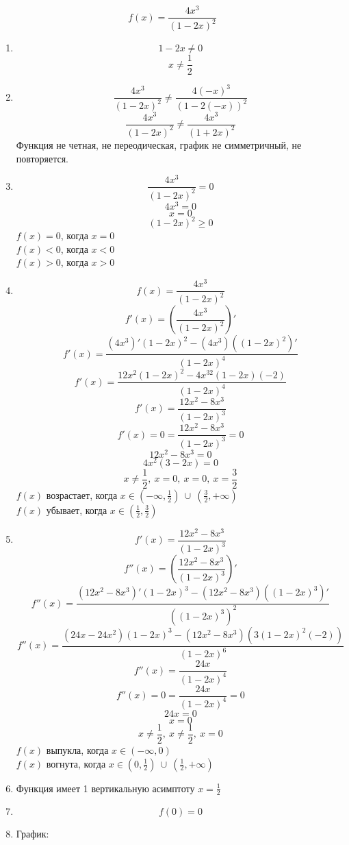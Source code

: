 \documentclass{article}
\begin{document}
$$ f(x) = \frac{4x^3}{(1-2x)^2}$$

\begin{enumerate}
  \item $$ 1-2x \neq 0$$ $$x \neq \frac{1}{2}$$
  \item $$ \frac{4x^3}{(1-2x)^2} \neq \frac{4(-x)^3}{(1-2(-x))^2}$$
        $$ \frac{4x^3}{(1-2x)^2} \neq \frac{4x^3}{(1+2x)^2}$$
        Функция не четная, не переодическая, график не симметричный, не повторяется.
  \item $$ \frac{4x^3}{(1-2x)^2} = 0$$
        $$  4x^3 = 0$$
        $$  x = 0 $$
        $$  (1-2x)^2 \geq 0 $$
        $ f(x) = 0 $, когда $x = 0$ \\
        $ f(x) < 0 $, когда $x < 0$ \\
        $ f(x) > 0 $, когда $x > 0$
  \item $$ f(x) =  \frac{4x^3}{(1-2x)^2} $$
        $$ f'(x) =  \left(\frac{4x^3}{(1-2x)^2}\right)' $$
        $$ f'(x) =  \frac{(4x^3)'(1-2x)^2 - (4x^3)((1-2x)^2)'}{(1-2x)^4} $$
        $$ f'(x) =  \frac{12x^2(1-2x)^2 - 4x^32(1-2x)(-2)}{(1-2x)^4} $$
        $$ f'(x) =  \frac{12x^2 - 8x^3}{(1-2x)^3} $$
        $$ f'(x) = 0 =  \frac{12x^2 - 8x^3}{(1-2x)^3} = 0 $$
        $$ 12x^2 - 8x^3= 0 $$
        $$ 4x^2(3 - 2x) = 0 $$
        $$ x \neq \frac{1}{2},\ x = 0,\ x=0,\ x = \frac{3}{2}$$
        $ f(x) $ возрастает, когда $x \in (-\infty, \frac{1}{2})\ \cup\ (\frac{3}{2},+\infty) $ \\
        $ f(x) $ убывает, когда $x \in (\frac{1}{2}, \frac{3}{2}) $ \\
  \item $$ f'(x) =  \frac{12x^2 - 8x^3}{(1-2x)^3} $$
        $$ f''(x) =  \left( \frac{12x^2 - 8x^3}{(1-2x)^3}\right)' $$
        $$ f''(x) =  \frac{(12x^2 - 8x^3)'(1-2x)^3 - (12x^2 - 8x^3)((1-2x)^3)'}{((1-2x)^3)^2} $$
        $$ f''(x) =  \frac{(24x - 24x^2)(1-2x)^3 - (12x^2 - 8x^3)(3(1-2x)^2(-2))}{(1-2x)^6} $$
        $$ f''(x) =  \frac{24x}{(1-2x)^4} $$
        $$ f''(x) = 0 =   \frac{24x}{(1-2x)^4} = 0 $$
        $$  24x = 0 $$
        $$ x = 0 $$
        $$ x \neq \frac{1}{2},\ x\neq\frac{1}{2},\ x = 0$$
        $ f(x) $ выпукла, когда $x \in (-\infty, 0)$ \\
        $ f(x) $ вогнута, когда $x \in (0, \frac{1}{2})\ \cup\ (\frac{1}{2}, +\infty) $
  \item Функция имеет 1 вертикальную асимптоту $x =\frac{1}{2}$
  \item $$ f(0) = 0 $$
  \item График:


\end{enumerate}
\end{document}
